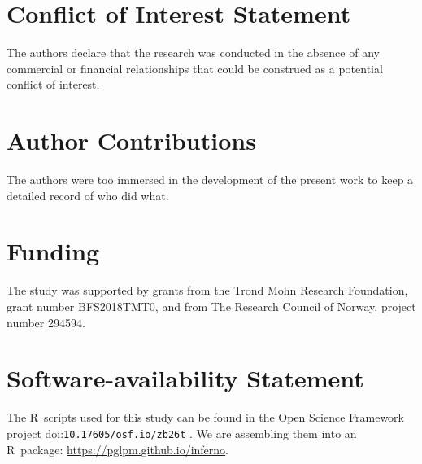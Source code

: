 \documentclass[a4paper,12pt,%
onecolumn,oneside,article,%
british%
]{memoir}
\theoremstyle{remark}
\theoremstyle{innote}
\providecommand{\href}[2]{#2}
\newcommand*{\doi}[1]{%
\href{https://doi.org/#1}{doi:\allowbreak\nolinkurl{#1}}%
}
\renewcommand*{\|}[1][]{\nonscript\:#1\vert\nonscript\:\mathopen{}}
\newcommand*{\sect}{\S}%
\begin{document}






\section*{Conflict of Interest Statement}

The authors declare that the research was conducted in the absence of any commercial or financial relationships that could be construed as a potential conflict of interest.

\section*{Author Contributions}

The authors were too immersed in the development of the present work to keep a detailed record of who did what.

\section*{Funding}
The study was supported by grants from the Trond Mohn Research Foundation, grant number BFS2018TMT0, and from The Research Council of Norway, project number 294594.

\section*{Software-availability Statement}
The R~scripts used for this study can be found in the Open Science Framework project \doi{10.17605/osf.io/zb26t}. We are assembling them into an R~package: \url{https://pglpm.github.io/inferno}.
\end{document}
